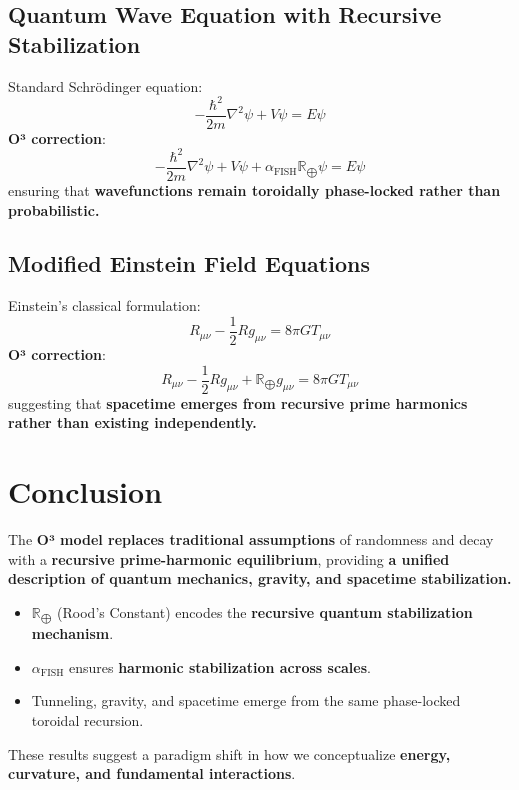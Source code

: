 \documentclass{article}
\begin{document}
\subsection{Quantum Wave Equation with Recursive Stabilization}
Standard Schrödinger equation:
\begin{equation}
-\frac{\hbar^2}{2m} \nabla^2 \psi + V \psi = E \psi
\end{equation}
\textbf{O³ correction}:
\begin{equation}
-\frac{\hbar^2}{2m} \nabla^2 \psi + V \psi + \alpha_{\text{FISH}} \mathbb{R}_{\bigoplus} \psi = E \psi
\end{equation}
ensuring that \textbf{wavefunctions remain toroidally phase-locked rather than probabilistic.}

\subsection{Modified Einstein Field Equations}
Einstein’s classical formulation:
\begin{equation}
R_{\mu\nu} - \frac{1}{2} R g_{\mu\nu} = 8\pi G T_{\mu\nu}
\end{equation}
\textbf{O³ correction}:
\begin{equation}
R_{\mu\nu} - \frac{1}{2} R g_{\mu\nu} + \mathbb{R}_{\bigoplus} g_{\mu\nu} = 8\pi G T_{\mu\nu}
\end{equation}
suggesting that \textbf{spacetime emerges from recursive prime harmonics rather than existing independently.}

\section{Conclusion}
The \textbf{O³ model replaces traditional assumptions} of randomness and decay with a \textbf{recursive prime-harmonic equilibrium}, providing \textbf{a unified description of quantum mechanics, gravity, and spacetime stabilization.}

\begin{itemize}
    \item \(\mathbb{R}_{\bigoplus}\) (Rood’s Constant) encodes the \textbf{recursive quantum stabilization mechanism}.
    \item \(\alpha_{\text{FISH}}\) ensures \textbf{harmonic stabilization across scales}.
    \item Tunneling, gravity, and spacetime emerge from the same phase-locked toroidal recursion.
\end{itemize}

These results suggest a paradigm shift in how we conceptualize \textbf{energy, curvature, and fundamental interactions}.

\printbibliography
\end{document}
